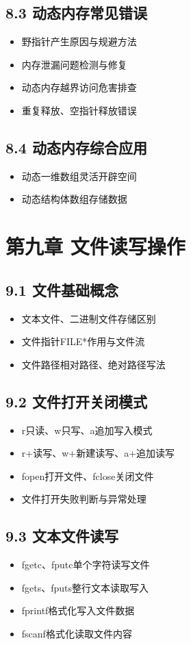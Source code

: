 \subsection*{8.3 动态内存常见错误}
\begin{itemize}
\item 野指针产生原因与规避方法
\item 内存泄漏问题检测与修复
\item 动态内存越界访问危害排查
\item 重复释放、空指针释放错误
\end{itemize}

\subsection*{8.4 动态内存综合应用}
\begin{itemize}
\item 动态一维数组灵活开辟空间
\item 动态结构体数组存储数据
\end{itemize}

\section*{第九章 文件读写操作}
\subsection*{9.1 文件基础概念}
\begin{itemize}
\item 文本文件、二进制文件存储区别
\item 文件指针FILE*作用与文件流
\item 文件路径相对路径、绝对路径写法
\end{itemize}

\subsection*{9.2 文件打开关闭模式}
\begin{itemize}
\item r只读、w只写、a追加写入模式
\item r+读写、w+新建读写、a+追加读写
\item fopen打开文件、fclose关闭文件
\item 文件打开失败判断与异常处理
\end{itemize}

\subsection*{9.3 文本文件读写}
\begin{itemize}
\item fgetc、fputc单个字符读写文件
\item fgets、fputs整行文本读取写入
\item fprintf格式化写入文件数据
\item fscanf格式化读取文件内容
\end{itemize}

